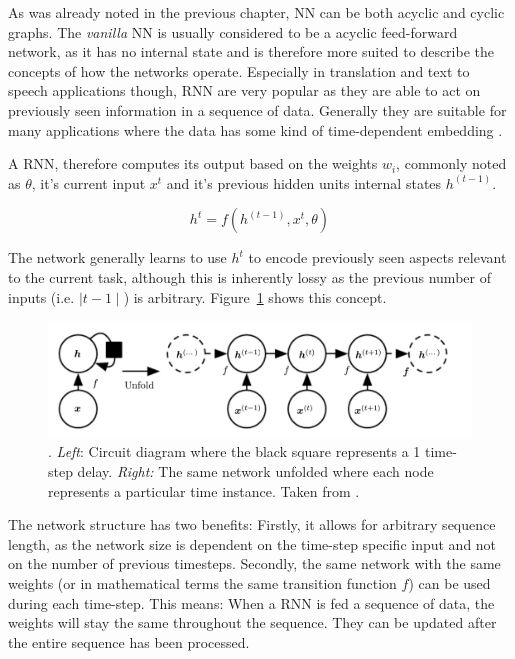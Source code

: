 As was already noted in the previous chapter, \ac {NN} can be both acyclic and cyclic graphs. The
\emph{vanilla} \ac {NN} is usually considered to be a acyclic feed-forward network, as it has no internal state and is
therefore more suited to describe the concepts of how the networks operate. Especially in translation and text to speech
applications though, \ac {RNN} are very popular as they are able to act on previously seen information in a sequence of
data. Generally they are suitable for many applications where the data has some kind of time-dependent embedding
\cite[p.373]{Goodfellow-et-al-2016}.

A \ac {RNN}, therefore computes its output based on the weights $w_i$, commonly noted as $\theta$, it's current input
$x^t$ and it's previous hidden units internal states $h^(t-1)$.

\[
    h^t = f(h^(t-1), x^t, \theta)
\]

The network generally learns to use $h^t$ to encode previously seen aspects relevant to the current task, although this
is inherently lossy as the previous number of inputs (i.e. $\mid t-1\mid$) is arbitrary. Figure~\ref{fig:rnn_concept}
shows this concept.

\begin{figure}[]
    \centering
    \includegraphics[width=0.8\linewidth]{img/rnn_concept.png}
    \caption[Recurrent Neural Network conceptualized]{. \emph{Left}: Circuit diagram where the black square represents a
    1 time-step delay. \emph{Right:} The same network unfolded where each node represents a particular time instance.
    Taken from \citet{Goodfellow-et-al-2016}.}
    \label{fig:rnn_concept}
\end{figure}

The network structure has two benefits: Firstly, it allows for arbitrary sequence length, as the network size is
dependent on the time-step specific input and not on the number of previous timesteps. Secondly, the same network with
the same weights (or in mathematical terms the same transition function $f$) can be used during each time-step. This
means: When a \ac {RNN} is fed a sequence of data, the weights will stay the same throughout the sequence. They can be
updated after the entire sequence has been processed. 
